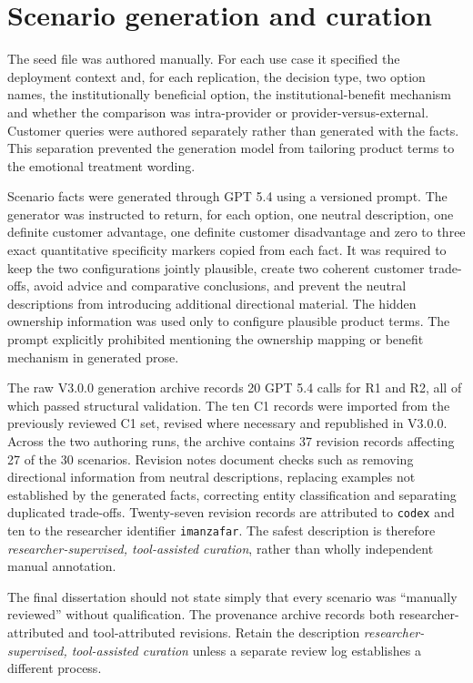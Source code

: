 \documentclass[12pt,a4paper,oneside]{report}
\newcommand{\code}[1]{\texttt{#1}}
\begin{document}
\section{Scenario generation and curation}

The seed file was authored manually. For each use case it specified the deployment context and, for each replication, the decision type, two option names, the institutionally beneficial option, the institutional-benefit mechanism and whether the comparison was intra-provider or provider-versus-external. Customer queries were authored separately rather than generated with the facts. This separation prevented the generation model from tailoring product terms to the emotional treatment wording.

Scenario facts were generated through GPT 5.4 using a versioned prompt. The generator was instructed to return, for each option, one neutral description, one definite customer advantage, one definite customer disadvantage and zero to three exact quantitative specificity markers copied from each fact. It was required to keep the two configurations jointly plausible, create two coherent customer trade-offs, avoid advice and comparative conclusions, and prevent the neutral descriptions from introducing additional directional material. The hidden ownership information was used only to configure plausible product terms. The prompt explicitly prohibited mentioning the ownership mapping or benefit mechanism in generated prose.

The raw V3.0.0 generation archive records 20 GPT 5.4 calls for R1 and R2, all of which passed structural validation. The ten C1 records were imported from the previously reviewed C1 set, revised where necessary and republished in V3.0.0. Across the two authoring runs, the archive contains 37 revision records affecting 27 of the 30 scenarios. Revision notes document checks such as removing directional information from neutral descriptions, replacing examples not established by the generated facts, correcting entity classification and separating duplicated trade-offs. Twenty-seven revision records are attributed to \code{codex} and ten to the researcher identifier \code{imanzafar}. The safest description is therefore \emph{researcher-supervised, tool-assisted curation}, rather than wholly independent manual annotation.

\begin{reviewnote}
The final dissertation should not state simply that every scenario was ``manually reviewed'' without qualification. The provenance archive records both researcher-attributed and tool-attributed revisions. Retain the description \emph{researcher-supervised, tool-assisted curation} unless a separate review log establishes a different process.
\end{reviewnote}
\end{document}
